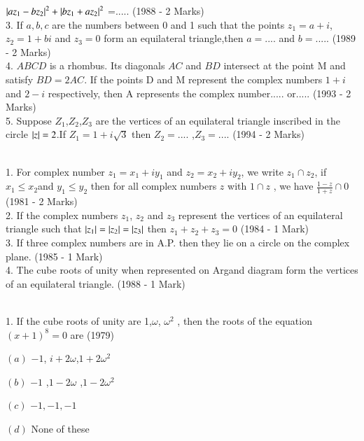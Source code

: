 \documentclass[journal,12pt,twocolumn]{IEEEtran}
\theoremstyle{remark}
\begin{document}
$\left\vert az_1-bz_2\right\vert^2+\left\vert bz_1+az_2\right\vert^2$ =.....  \hfill(1988 - 2 Marks)\\
3.  If $a,b,c$ are the numbers between 0 and 1 such that the points $z_1=a+i$, $z_2=1+bi$ and $z_3=0$ form an equilateral triangle,then $a=....$ and $b=.....$ \hfill(1989 - 2 Marks)\\
4.  $ABCD$ is a rhombus. Its diagonals $AC$ and $BD$ intersect at the point M and satisfy $BD=2AC$. If the points D and M represent the complex numbers $1+i$ and $2-i$ respectively, then A represents the complex number..... or..... \hfill(1993 - 2 Marks)\\
5.  Suppose $Z_1$,$Z_2$,$Z_3$ are the vertices of an equilateral triangle inscribed in the circle $\left\vert z\right\vert=2$.If $Z_1=1+i\sqrt{3}$ then $Z_2=....$ ,$Z_3=.... $ \hfill(1994 - 2 Marks)\\
\\
1.  For complex number $z_1=x_1+iy_1 $ and $z_2=x_2+iy_2$, we write $z_1\cap z_2$, if $x_1\leq x_2 $and $y_1\leq y_2 $ then for all complex numbers $z$ with $1\cap z$ , we have $\frac{1-z}{1+z} \cap 0$  \hfill(1981 - 2 Marks)\\
2.  If the complex numbers $z_1$, $z_2$ and $z_3 $ represent the vertices of an equilateral triangle such that $ \left\vert z_1\right\vert = \left\vert z_2\right\vert=\left\vert z_3\right\vert $ then $z_1+z_2+z_3 = 0$ \hfill(1984 - 1 Mark)\\
3.  If three complex numbers are in A.P. then they lie on a circle on the complex plane. \hfill(1985 - 1 Mark)\\
4.  The cube roots of unity when represented on Argand diagram form the vertices of an equilateral triangle. \hfill(1988 - 1 Mark)\\
\\
  1. If the cube roots of unity are 1,$\omega $, $\omega^2$ , then the roots of the equation $(x+1)^8 = 0$ are                     \hfill(1979)
\begin{multicols}{2}
\item $(a)$ $-1$, $i+2\omega$,$1+2\omega^2$
\item $(b)$ $-1$ ,$1-2\omega$ ,$1-2\omega^2$
\item $(c)$ $ -1 , -1 ,-1 $ 
\item $(d)$ None of these
\end{multicols}
\end{document}
